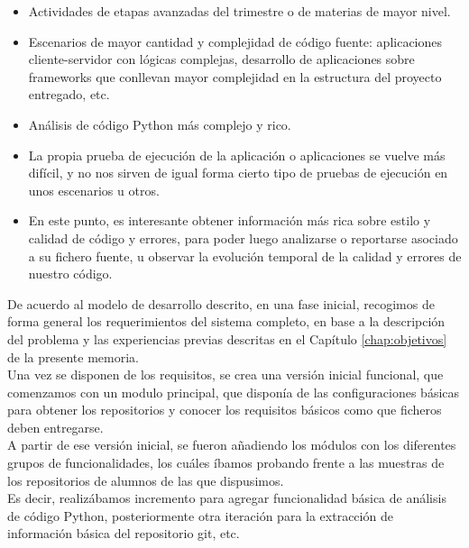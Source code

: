 \begin{itemize}
\item Actividades de etapas avanzadas del trimestre o de materias de mayor nivel.

\item Escenarios de mayor cantidad y complejidad de código fuente: aplicaciones cliente-servidor con lógicas complejas, desarrollo de aplicaciones sobre frameworks que conllevan mayor complejidad en la estructura del proyecto entregado, etc.

\item Análisis de código Python más complejo y rico.

\item La propia prueba de ejecución de la aplicación o aplicaciones se vuelve más difícil, y no nos sirven de igual forma cierto tipo de pruebas de ejecución en unos escenarios u otros.

\item En este punto, es interesante obtener información más rica sobre estilo y calidad de código y errores, para poder luego analizarse o reportarse asociado a su fichero fuente, u observar la evolución temporal de la calidad y errores de nuestro código.
\end{itemize}


De acuerdo al modelo de desarrollo descrito, en una fase inicial, recogimos de forma general los requerimientos del sistema completo, en base a la descripción del problema y las experiencias previas descritas en el Capítulo \ref{chap:objetivos} de la presente memoria.\\


Una vez se disponen de los requisitos, se crea una versión inicial funcional, que comenzamos con un modulo principal, que disponía de las configuraciones básicas para obtener los repositorios y conocer los requisitos básicos como que ficheros deben entregarse.\\


A partir de ese versión inicial, se fueron añadiendo los módulos con los diferentes grupos de funcionalidades, los cuáles íbamos probando frente a las muestras de los repositorios de alumnos de las que dispusimos.\\


Es decir, realizábamos incremento para agregar funcionalidad básica de análisis de código Python, posteriormente otra iteración para la extracción de información básica del repositorio git, etc.\\


